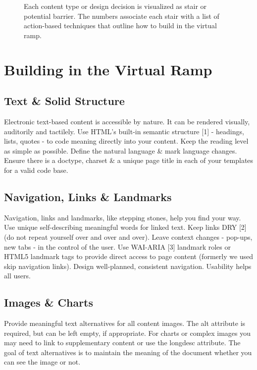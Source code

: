 \documentclass{acm_proc_article-sp}
\begin{document}
\begin{figure*}
\centering
{}
\caption{Each content type or design decision is visualized as stair or potential barrier. The numbers associate each stair with a list of action-based techniques that outline how to build in the virtual ramp.}
\end{figure*}

\section{Building in the {\secit Virtual} Ramp}

\subsection{Text \& Solid Structure}

Electronic text-based content is accessible by nature. It can be rendered visually, auditorily and tactilely. Use HTML's built-in semantic structure [1] - headings, lists, quotes - to code meaning directly into your content. Keep the reading level as simple as possible. Define the natural language \& mark language changes. Ensure there is a doctype, charset \& a unique page title in each of your templates for a valid code base.

\subsection{Navigation, Links \& Landmarks}
Navigation, links and landmarks, like stepping stones, help you find your way. Use unique self-describing meaningful words for linked text. Keep links DRY [2] (do not repeat yourself over and over and over). Leave context changes - pop-ups, new tabs - in the control of the user. Use WAI-ARIA [3] landmark roles or HTML5 landmark tags to provide direct access to page content (formerly we used skip navigation links). Design well-planned, consistent navigation. Usability helps all users.

\subsection{Images \& Charts}
Provide meaningful text alternatives for all content images. The alt attribute is required, but can be left empty, if appropriate. For charts or complex images you may need to link to supplementary content or use the longdesc attribute. The goal of text alternatives is to maintain the meaning of the document whether you can see the image or not.
\end{document}
